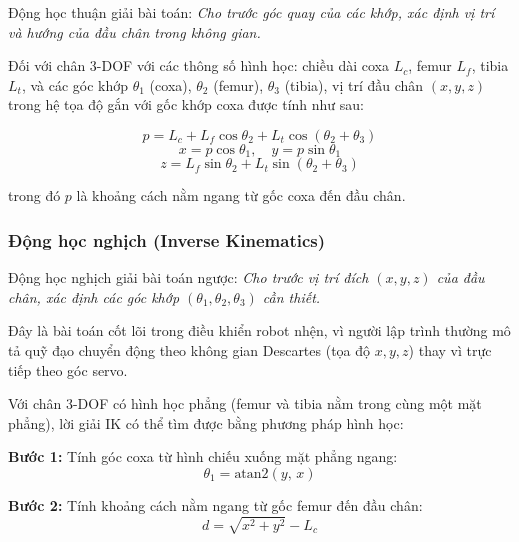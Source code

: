         \hspace{0.5cm} Động học thuận giải bài toán: \textit{Cho trước góc quay của các khớp, xác định vị trí và hướng của đầu chân trong không gian.}

        Đối với chân 3-DOF với các thông số hình học: chiều dài coxa $L_c$, femur $L_f$, tibia $L_t$, và các góc khớp $\theta_1$ (coxa), $\theta_2$ (femur), $\theta_3$ (tibia), vị trí đầu chân $(x, y, z)$ trong hệ tọa độ gắn với gốc khớp coxa được tính như sau:

        \begin{equation}
            p = L_c + L_f \cos\theta_2 + L_t \cos(\theta_2 + \theta_3)
        \end{equation}
        \begin{equation}
            x = p \cos\theta_1, \quad y = p \sin\theta_1
        \end{equation}
        \begin{equation}
            z = L_f \sin\theta_2 + L_t \sin(\theta_2 + \theta_3)
        \end{equation}

        trong đó $p$ là khoảng cách nằm ngang từ gốc coxa đến đầu chân.

        \subsubsection{Động học nghịch (Inverse Kinematics)}

        \hspace{0.5cm} Động học nghịch giải bài toán ngược: \textit{Cho trước vị trí đích $(x, y, z)$ của đầu chân, xác định các góc khớp $(\theta_1, \theta_2, \theta_3)$ cần thiết.}

        Đây là bài toán cốt lõi trong điều khiển robot nhện, vì người lập trình thường mô tả quỹ đạo chuyển động theo không gian Descartes (tọa độ $x, y, z$) thay vì trực tiếp theo góc servo.

        Với chân 3-DOF có hình học phẳng (femur và tibia nằm trong cùng một mặt phẳng), lời giải IK có thể tìm được bằng phương pháp hình học:

        \textbf{Bước 1:} Tính góc coxa từ hình chiếu xuống mặt phẳng ngang:
        \begin{equation}
            \theta_1 = \text{atan2}(y,\, x)
        \end{equation}

        \textbf{Bước 2:} Tính khoảng cách nằm ngang từ gốc femur đến đầu chân:
        \begin{equation}
            d = \sqrt{x^2 + y^2} - L_c
        \end{equation}

